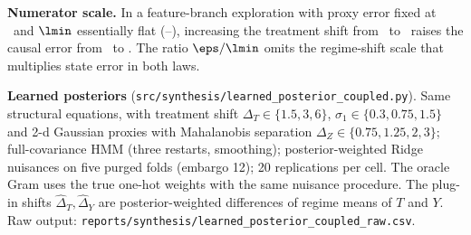 \textbf{Numerator scale.} In a feature-branch exploration with proxy error fixed at \DEEps\ and $\lmin$ essentially flat (\DELamLo--\DELamHi), increasing the treatment shift from \DETLo\ to \DETHi\ raises the causal error from \DEErrLo\ to \DEErrHi. The ratio $\eps/\lmin$ omits the regime-shift scale that multiplies state error in both laws.

\textbf{Learned posteriors} (\texttt{src/synthesis/learned\_posterior\_coupled.py}). Same structural equations, with treatment shift $\Delta_T\in\{1.5,3,6\}$, $\sigma_1\in\{0.3,0.75,1.5\}$ and 2-d Gaussian proxies with Mahalanobis separation $\Delta_Z\in\{0.75,1.25,2,3\}$; full-covariance HMM (three restarts, smoothing); posterior-weighted Ridge nuisances on five purged folds (embargo 12); 20 replications per cell. The oracle Gram uses the true one-hot weights with the same nuisance procedure. The plug-in shifts $\hat\Delta_T,\hat\Delta_Y$ are posterior-weighted differences of regime means of $T$ and $Y$. Raw output: \texttt{reports/synthesis/learned\_posterior\_coupled\_raw.csv}.

